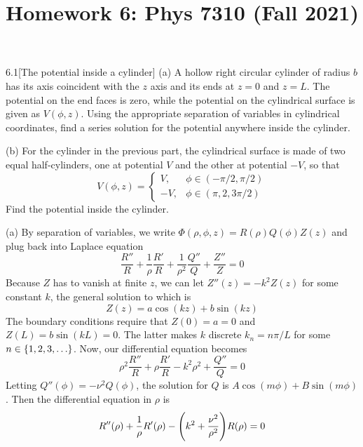 \documentclass[12pt]{article}
\title{Homework 6: Phys 7310 (Fall 2021)}
\begin{document}
\maketitle

\begin{problem}{6.1}[The potential inside a cylinder]
(a) A hollow right circular cylinder of radius $b$ has its axis coincident with 
the $z$ axis and its ends at $z=0$ and $z=L$. The potential on the end faces is
zero, while the potential on the cylindrical surface is given as $V(\phi,z)$.
Using the appropriate separation of variables in cylindrical coordinates, find a
series solution for the potential anywhere inside the cylinder.

(b) For the cylinder in the previous part, the cylindrical surface is made of
two equal half-cylinders, one at potential $V$ and the other at potential $-V$,
so that
\begin{equation}\label{p1:V}
    V(\phi,z)=\begin{cases}
        V, & \phi\in(-\pi/2,\pi/2)\\
        -V, & \phi\in(\pi,2,3\pi/2)
    \end{cases}
\end{equation}
Find the potential inside the cylinder.
\begin{solution}
(a) By separation of variables, we write
$\Phi(\rho,\phi,z)=R(\rho)Q(\phi)Z(z)$ and plug back into Laplace equation
\begin{equation}
    \frac{R''}{R}+\frac1{\rho}\frac{R'}{R}+\frac1{\rho^2}\frac{Q''}{Q}+\frac{Z''}{Z}=0
\end{equation}
Because $Z$ has to vanish at finite $z$, we can let $Z''(z)=-k^2Z(z)$ for some
constant $k$, the general solution to which is
\begin{equation}
    Z(z)=a\cos(kz)+b\sin(kz) 
\end{equation}
The boundary conditions require that $Z(0)=a=0$ and $Z(L)=b\sin(kL)=0$. The
latter makes $k$ discrete $k_n=n\pi /L$ for some $n\in\qty{1,2,3,\ldots}$. Now, 
our differential equation becomes
\begin{equation}
\rho^2\frac{R''}{R}+\rho\frac{R'}{R}-k^2\rho^2+\frac{Q''}{Q}=0
\end{equation}
Letting $Q''(\phi)=-\nu^2Q(\phi)$, the solution for $Q$ is
$A\cos(m\phi)+B\sin(m\phi)$. Then the differential equation in $\rho$ is
\begin{equation}
    R''(\rho)+\frac1\rho R'(\rho)-\qty(k^2+\frac{\nu^2}{\rho^2})R(\rho)=0

\end{equation}
\end{solution}
\end{problem}
\end{document}
